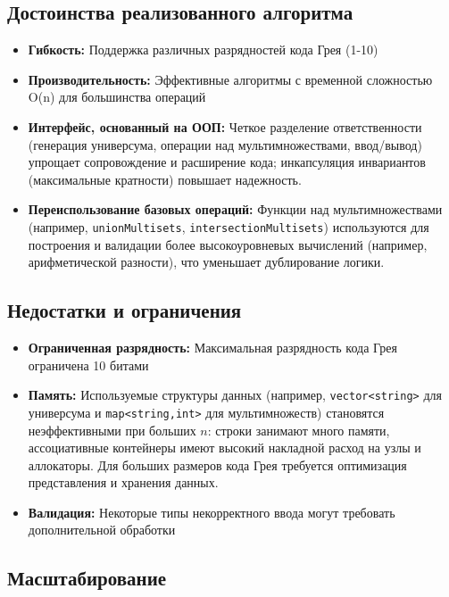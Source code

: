\documentclass[12pt,a4paper]{article}
\begin{document}
\subsection{Достоинства реализованного алгоритма}

\begin{itemize}
    \item \textbf{Гибкость:} Поддержка различных разрядностей кода Грея (1-10)
    \item \textbf{Производительность:} Эффективные алгоритмы с временной сложностью O(n) для большинства операций
    \item \textbf{Интерфейс, основанный на ООП:} Четкое разделение ответственности (генерация универсума, операции над мультимножествами, ввод/вывод) упрощает сопровождение и расширение кода; инкапсуляция инвариантов (максимальные кратности) повышает надежность.
    \item \textbf{Переиспользование базовых операций:} Функции над мультимножествами (например, \texttt{unionMultisets}, \texttt{intersectionMultisets}) используются для построения и валидации более высокоуровневых вычислений (например, арифметической разности), что уменьшает дублирование логики.
\end{itemize}

\subsection{Недостатки и ограничения}

\begin{itemize}
    \item \textbf{Ограниченная разрядность:} Максимальная разрядность кода Грея ограничена 10 битами
    \item \textbf{Память:} Используемые структуры данных (например, \texttt{vector<string>} для универсума и \texttt{map<string,int>} для мультимножеств) становятся неэффективными при больших $n$: строки занимают много памяти, ассоциативные контейнеры имеют высокий накладной расход на узлы и аллокаторы. Для больших размеров кода Грея требуется оптимизация представления и хранения данных.
    \item \textbf{Валидация:} Некоторые типы некорректного ввода могут требовать дополнительной обработки
\end{itemize}

\subsection{Масштабирование}
\end{document}

